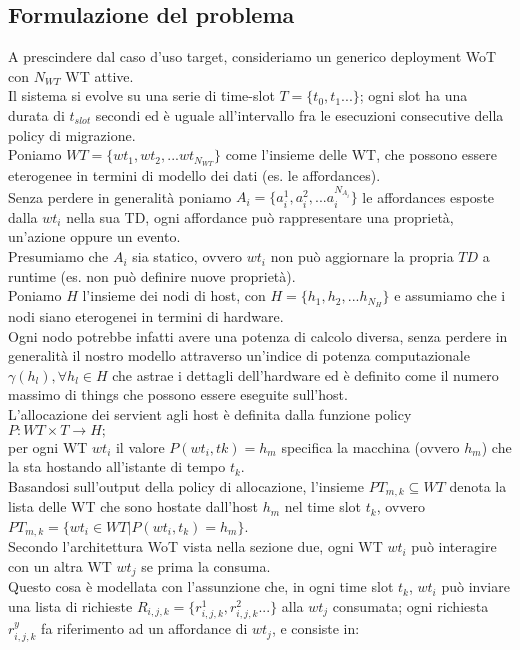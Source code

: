 \documentclass[11pt]{article}
\begin{document}
		\subsection{Formulazione del problema}
		A prescindere dal caso d'uso target, consideriamo un generico deployment WoT con $N_{WT}$ WT attive. \\
		Il sistema si evolve su una serie di time-slot $T = \{t_0, t_1...\}$; ogni slot ha una durata di $t_{slot}$ secondi ed è uguale all'intervallo fra le esecuzioni consecutive della policy di migrazione. \\
		Poniamo $WT = \{ wt_1, wt_2, ... wt_{N_{WT}} \}$ come l'insieme delle WT, che possono essere eterogenee in termini di modello dei dati (es. le affordances). \\
		Senza perdere in generalità poniamo $A_i = \{a_i^1, a_i^2, ... a_i^{N_{A_i}}\}$ le affordances esposte dalla $wt_i$ nella sua TD, ogni affordance può rappresentare una proprietà, un'azione oppure un evento. \\
		Presumiamo che $A_i$ sia statico, ovvero $wt_i$ non può aggiornare la propria $TD$ a runtime (es. non può definire nuove proprietà).\\
		Poniamo $H$ l'insieme dei nodi di host, con $H = \{h_1, h_2, ... h_{N_H}\}$ e assumiamo che i nodi siano eterogenei in termini di hardware. \\
		Ogni nodo potrebbe infatti avere una potenza di calcolo diversa, senza perdere in generalità il nostro modello attraverso un'indice di potenza computazionale $\gamma(h_l), \forall h_l \in H$ che astrae i dettagli dell'hardware ed è definito come il numero massimo di things che possono essere eseguite sull'host. \\
		L'allocazione dei servient agli host è definita dalla funzione policy $P : WT \times T \rightarrow H;$ \\
		per ogni WT $wt_i$ il valore $P(wt_i, tk) = h_m$ specifica la macchina (ovvero $h_m$) che la sta hostando all'istante di tempo $t_k$. \\
		Basandosi sull'output della policy di allocazione, l'insieme $PT_{m,k} \subseteq WT$ denota la lista delle WT che sono hostate dall'host $h_m$ nel time slot $t_k$, ovvero $PT_{m,k} = \{ wt_i \in WT | P(wt_i, t_k) = h_m \}$. \\
		Secondo l'architettura WoT vista nella sezione due, ogni WT $wt_i$ può interagire con un altra WT $wt_j$ se prima la consuma. \\
		Questo cosa è modellata con l'assunzione che, in ogni time slot $t_k$, $wt_i$ può inviare una lista di richieste $R_{i,j,k} = \{ r^1_{i,j,k}, r^2_{i,j,k} ...  \}$ alla $wt_j$ consumata; ogni richiesta $r^y_{i,j,k}$ fa riferimento ad un affordance di $wt_j$, e consiste in:
\end{document}
